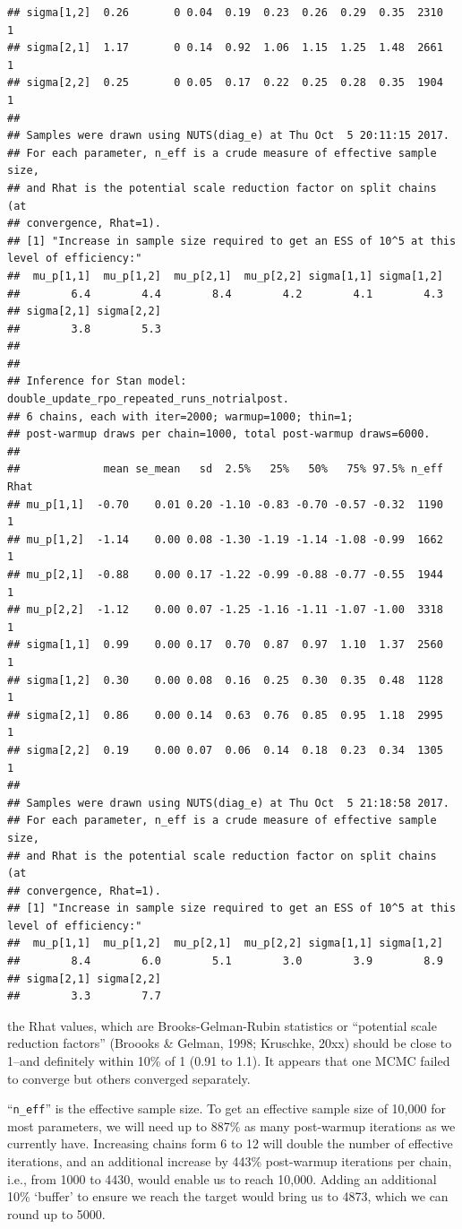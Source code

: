 \documentclass[]{article}
\begin{document}
\begin{verbatim}
## sigma[1,2]  0.26       0 0.04  0.19  0.23  0.26  0.29  0.35  2310    1
## sigma[2,1]  1.17       0 0.14  0.92  1.06  1.15  1.25  1.48  2661    1
## sigma[2,2]  0.25       0 0.05  0.17  0.22  0.25  0.28  0.35  1904    1
## 
## Samples were drawn using NUTS(diag_e) at Thu Oct  5 20:11:15 2017.
## For each parameter, n_eff is a crude measure of effective sample size,
## and Rhat is the potential scale reduction factor on split chains (at 
## convergence, Rhat=1).
## [1] "Increase in sample size required to get an ESS of 10^5 at this level of efficiency:"
##  mu_p[1,1]  mu_p[1,2]  mu_p[2,1]  mu_p[2,2] sigma[1,1] sigma[1,2] 
##        6.4        4.4        8.4        4.2        4.1        4.3 
## sigma[2,1] sigma[2,2] 
##        3.8        5.3 
## 
## 
## Inference for Stan model: double_update_rpo_repeated_runs_notrialpost.
## 6 chains, each with iter=2000; warmup=1000; thin=1; 
## post-warmup draws per chain=1000, total post-warmup draws=6000.
## 
##             mean se_mean   sd  2.5%   25%   50%   75% 97.5% n_eff Rhat
## mu_p[1,1]  -0.70    0.01 0.20 -1.10 -0.83 -0.70 -0.57 -0.32  1190    1
## mu_p[1,2]  -1.14    0.00 0.08 -1.30 -1.19 -1.14 -1.08 -0.99  1662    1
## mu_p[2,1]  -0.88    0.00 0.17 -1.22 -0.99 -0.88 -0.77 -0.55  1944    1
## mu_p[2,2]  -1.12    0.00 0.07 -1.25 -1.16 -1.11 -1.07 -1.00  3318    1
## sigma[1,1]  0.99    0.00 0.17  0.70  0.87  0.97  1.10  1.37  2560    1
## sigma[1,2]  0.30    0.00 0.08  0.16  0.25  0.30  0.35  0.48  1128    1
## sigma[2,1]  0.86    0.00 0.14  0.63  0.76  0.85  0.95  1.18  2995    1
## sigma[2,2]  0.19    0.00 0.07  0.06  0.14  0.18  0.23  0.34  1305    1
## 
## Samples were drawn using NUTS(diag_e) at Thu Oct  5 21:18:58 2017.
## For each parameter, n_eff is a crude measure of effective sample size,
## and Rhat is the potential scale reduction factor on split chains (at 
## convergence, Rhat=1).
## [1] "Increase in sample size required to get an ESS of 10^5 at this level of efficiency:"
##  mu_p[1,1]  mu_p[1,2]  mu_p[2,1]  mu_p[2,2] sigma[1,1] sigma[1,2] 
##        8.4        6.0        5.1        3.0        3.9        8.9 
## sigma[2,1] sigma[2,2] 
##        3.3        7.7
\end{verbatim}

the Rhat values, which are Brooks-Gelman-Rubin statistics or ``potential
scale reduction factors'' (Broooks \& Gelman, 1998; Kruschke, 20xx)
should be close to 1--and definitely within 10\% of 1 (0.91 to 1.1). It
appears that one MCMC failed to converge but others converged
separately.

``\texttt{n\_eff}'' is the effective sample size. To get an effective
sample size of 10,000 for most parameters, we will need up to 887\% as
many post-warmup iterations as we currently have. Increasing chains form
6 to 12 will double the number of effective iterations, and an
additional increase by 443\% post-warmup iterations per chain, i.e.,
from 1000 to 4430, would enable us to reach 10,000. Adding an additional
10\% `buffer' to ensure we reach the target would bring us to 4873,
which we can round up to 5000.
\end{document}
